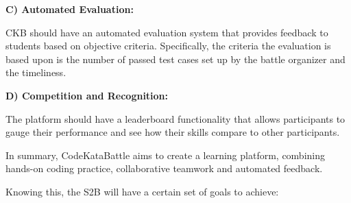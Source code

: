 \documentclass{article}
\begin{document}
\textbf{C) Automated Evaluation:}

CKB should have an automated evaluation system that provides feedback to students based on
 objective criteria. Specifically, the criteria the evaluation is based upon is the number of passed test cases 
 set up by the battle organizer and the timeliness. 

 \textbf{D) Competition and Recognition:}

The platform should have a leaderboard functionality that allows participants to 
gauge their performance and see how their skills compare to other participants.

In summary, CodeKataBattle aims to create a learning platform, combining 
hands-on coding practice, collaborative teamwork and automated feedback.

Knowing this, the S2B will have a certain set of goals to achieve:
\end{document}
